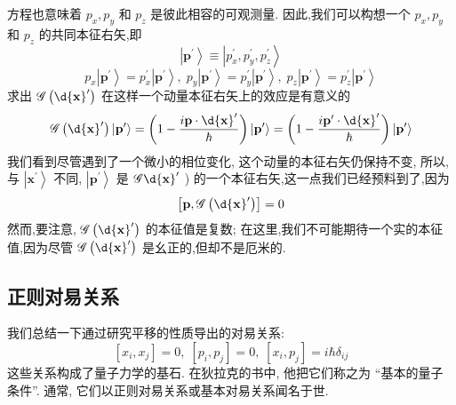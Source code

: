 \documentclass[lang=cn,newtx,10pt,scheme=chinese,thmcnt=section]{elegantbook}
\begin{document}
方程也意味着 ${p}_{x},{p}_{y}$ 和 ${p}_{z}$ 是彼此相容的可观测量. 因此,我们可以构想一个 ${p}_{x},{p}_{y}$ 和 ${p}_{z}$ 的共同本征右矢,即
\begin{equation}
	\left| {\mathbf{p}}^{\prime }\right\rangle \equiv \left| {{p}_{x}^{\prime },{p}_{y}^{\prime },{p}_{z}^{\prime }}\right\rangle
\end{equation}
\begin{equation}
	{p}_{x}\left| {\mathbf{p}}^{\prime }\right\rangle = {p}_{x}^{\prime }\left| {\mathbf{p}}^{\prime }\right\rangle ,\;{p}_{y}\left| {\mathbf{p}}^{\prime }\right\rangle = {p}_{y}^{\prime }\left| {\mathbf{p}}^{\prime }\right\rangle ,\;{p}_{z}\left| {\mathbf{p}}^{\prime }\right\rangle = {p}_{z}^{\prime }\left| {\mathbf{p}}^{\prime }\right\rangle
\end{equation}
求出 $\mathscr{G} \left( {\d{\mathbf{x}}^{\prime }}\right)$ 在这样一个动量本征右矢上的效应是有意义的
\begin{equation}
	\mathscr{G}\left( {\d{\mathbf{x}}^{\prime }}\right) \left| {\mathbf{p}}^{\prime }\right\rangle = \left( {1 - \frac{i\mathbf{p} \cdot \d{\mathbf{x}}^{\prime }}{\hbar }}\right) \left| {\mathbf{p}}^{\prime }\right\rangle = \left( {1 - \frac{i{\mathbf{p}}^{\prime } \cdot \d{\mathbf{x}}^{\prime }}{\hbar }}\right) \left| {\mathbf{p}}^{\prime }\right\rangle
\end{equation}
我们看到尽管遇到了一个微小的相位变化, 这个动量的本征右矢仍保持不变, 所以, 与 $\left| {\mathbf{x}}^{\prime }\right\rangle$ 不同, $\left| {\mathbf{p}}^{\prime }\right\rangle$ 是 $\mathscr{G}\d{\mathbf{x}}^{\prime }$ ) 的一个本征右矢,这一点我们已经预料到了,因为
\begin{equation}
	\left\lbrack {\mathbf{p},\mathscr{G}\left( {\d{\mathbf{x}}^{\prime }}\right) }\right\rbrack = 0
\end{equation}
然而,要注意, $\mathscr{G} \left( {\d{\mathbf{x}}^{\prime }}\right)$ 的本征值是复数; 在这里,我们不可能期待一个实的本征值,因为尽管 $\mathscr{G} \left( {\d{\mathbf{x}}^{\prime }}\right)$ 是幺正的,但却不是厄米的.
\subsection*{正则对易关系}
我们总结一下通过研究平移的性质导出的对易关系:
\begin{equation}
	\left\lbrack {{x}_{i},{x}_{j}}\right\rbrack = 0,\;\left\lbrack {{p}_{i},{p}_{j}}\right\rbrack = 0,\;\left\lbrack {{x}_{i},{p}_{j}}\right\rbrack = i\hbar {\delta }_{ij}
\end{equation}
这些关系构成了量子力学的基石. 在狄拉克的书中, 他把它们称之为 “基本的量子条件”. 通常, 它们以正则对易关系或基本对易关系闻名于世.
\end{document}
